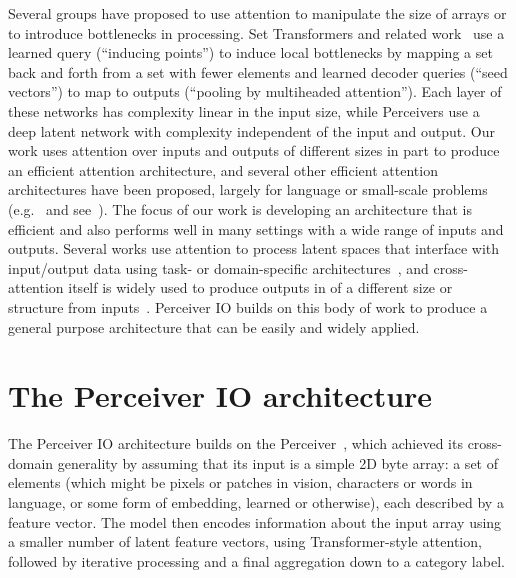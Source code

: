 \documentclass{article} %
\newcommand{\ourmodel}{Perceiver IO\xspace}
\begin{document}
Several groups have proposed to use attention to manipulate the size of arrays or to introduce bottlenecks in processing. Set Transformers and related work~\citep{lee2019set,goyal2021coordination} use a learned query (``inducing points'') to induce local bottlenecks by mapping a set back and forth from a set with fewer elements and learned decoder queries (``seed vectors'') to map to outputs (``pooling by multiheaded attention''). Each layer of these networks has complexity linear in the input size, while Perceivers use a deep latent network with complexity independent of the input and output. Our work uses attention over inputs and outputs of different sizes in part to produce an efficient attention architecture, and several other efficient attention architectures have been proposed, largely for language or small-scale problems (e.g.~\citealt{xiong2021nystromformer, wang2020linformer, tay2021synthesizer, beltagy2020longformer} and see~\citealt{tay2020long}). The focus of our work is developing an architecture that is efficient and also performs well in many settings with a wide range of inputs and outputs. Several works use attention to process latent spaces that interface with input/output data using task- or domain-specific architectures~\citep{carion2020endtoend, locatello2020object, wang2021maxdeeplab}, and cross-attention itself is widely used to produce outputs in of a different size or structure from inputs~\citep{dai2019transformerxl,desai2021virtex,miech2021thinking, vaswani2017attention, raffell2020exploring,santoro2018relational, hudson2021generative, ma2021luna}. \ourmodel{} builds on this body of work to produce a general purpose architecture that can be easily and widely applied.

\section{The \ourmodel{} architecture}

The \ourmodel{} architecture builds on the Perceiver~\citep{jaegle2021perceiver}, which achieved its cross-domain generality by assuming that its input is a simple 2D byte array: a set of elements (which might be pixels or patches in vision, characters or words in language, or some form of embedding, learned or otherwise), each described by a feature vector.  The model then encodes information about the input array using a smaller number of latent feature vectors, using Transformer-style attention, followed by iterative processing and a final aggregation down to a category label.
\end{document}
